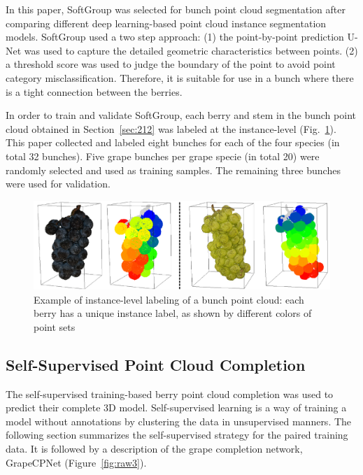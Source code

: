 \documentclass[12pt]{article}
\begin{document}
In this paper, SoftGroup \citep{vu_softgroup_2022} was selected for bunch point cloud segmentation after comparing different deep learning-based point cloud instance segmentation models. 
SoftGroup used a two step approach: 
(1) the point-by-point prediction U-Net was used to capture the detailed geometric characteristics between points. 
(2) a threshold score was used to judge the boundary of the point to avoid point category misclassification. 
Therefore, it is suitable for use in a bunch where there is a tight connection between the berries.

In order to train and validate SoftGroup, each berry and stem in the bunch point cloud obtained in Section~\ref{sec:212} was labeled at the instance-level (Fig.~\ref{fig:raw11}). 
This paper collected and labeled eight bunches for each of the four species (in total 32 bunches). 
Five grape bunches per grape specie (in total 20) were randomly selected and used as training samples. The remaining three bunches were used for validation.

\begin{figure}[hbt!]
    \centering
    \includegraphics[width=1\textwidth]{figures/Figure6.pdf}
    \caption{Example of instance-level labeling of a bunch point cloud: each berry has a unique instance label, as shown by different colors of point sets}
    \label{fig:raw11}
\end{figure}

\subsection{Self-Supervised Point Cloud Completion}

The self-supervised training-based berry point cloud completion was used to predict their complete 3D model. 
Self-supervised learning is a way of training a model without annotations by clustering the data in unsupervised manners. 
The following section summarizes the self-supervised strategy for the paired training data. It is followed by a description of the grape completion network, GrapeCPNet (Figure~\ref{fig:raw3}).
\end{document}
